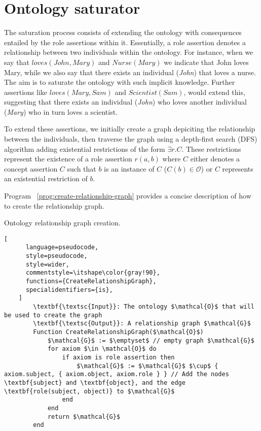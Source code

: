 
\chapter{Ontology saturator}

The saturation process consists of extending the ontology with consequences entailed by the role assertions within it. Essentially, a role assertion denotes a relationship between two individuals within the ontology. For instance, when we say that $loves(John, Mary)$ and $Nurse(Mary)$ we indicate that John loves Mary, while we also say that there exists an individual (\textit{John}) that loves a nurse. The aim is to saturate the ontology with such implicit knowledge. Further assertions like $loves(Mary, Sam)$ and $Scientist(Sam)$, would extend this, suggesting that there exists an individual (\textit{John}) who loves another individual (\textit{Mary}) who in turn loves a scientist.

To extend these assertions, we initially create a graph depiciting the relationship between the individuals, then traverse the graph using a depth-first search (DFS) algorithm adding existential restrictions of the form $\exists r.C$. These restrictions represent the existence of a role assertion $r(a, b)$ where $C$ either denotes a concept assertion $C$ such that $b$ is an instance of $C$ ($C(b) \in \mathcal{O}$) or $C$ represents an existential restriction of $b$.

Program ~\ref{prog:create-relationship-graph} provides a concise description of how to create the relationship graph.

\begin{programruledcaption}{Ontology relationship graph creation.\label{prog:create-relationship-graph}}
    \begin{lstlisting}[
      language=pseudocode,
      style=pseudocode,
      style=wider,
      commentstyle=\itshape\color{gray!90},
      functions={CreateRelationshipGraph},
      specialidentifiers={is},
    ]
        \textbf{\textsc{Input}}: The ontology $\mathcal{O}$ that will be used to create the graph
        \textbf{\textsc{Output}}: A relationship graph $\mathcal{G}$
        Function CreateRelationshipGraph($\mathcal{O}$)
            $\mathcal{G}$ := $\emptyset$ // empty graph $\mathcal{G}$
            for axiom $\in \mathcal{O}$ do
                if axiom is role assertion then
                    $\mathcal{G}$ := $\mathcal{G}$ $\cup$ { axiom.subject, { axiom.object, axiom.role } } // Add the nodes \textbf{subject} and \textbf{object}, and the edge \textbf{role(subject, object)} to $\mathcal{G}$ 
                end
            end 
            return $\mathcal{G}$
        end
    \end{lstlisting}
\end{programruledcaption}

